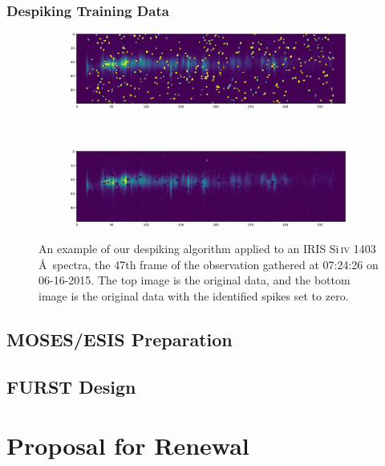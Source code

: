 \documentclass[10pt,letterpaper]{article}
\newcommand{\SiIV}{Si\,\textsc{iv} 1403 \AA\ }
\begin{document}
							
			\subsubsection{Despiking Training Data}	\label{sec_dspk}
			
				\begin{figure}[h!]
					\centering
					\begin{subfigure}[t]{\textwidth}
						\centering
						\includegraphics[width=\textwidth]{fig/orig}
					\end{subfigure}
					~ 
					\begin{subfigure}[t]{\textwidth}
						\centering
						\includegraphics[width=\textwidth]{fig/dspk}
					\end{subfigure}
					\caption{An example of our despiking algorithm applied to an IRIS \SiIV spectra, the 47th frame of the observation gathered at 07:24:26 on 06-16-2015. The top image is the original data, and the bottom image is the original data with the identified spikes set to zero.}
				\end{figure}
		
		\subsection{MOSES/ESIS Preparation}
		
		\subsection{FURST Design}
	
	\section{Proposal for Renewal}
	
\end{document}
